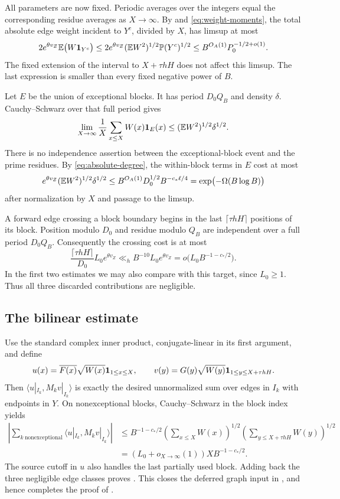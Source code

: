 All parameters are now fixed. Periodic averages over the integers equal
the corresponding residue averages as $X\to\infty$. By
 and \eqref{eq:weight-moments}, the total absolute
edge weight incident to $Y^c$, divided by $X$, has limsup at most
\[
 2e^{\theta v_Z}\mathbb E\bigl(W\mathbf 1_{Y^c}\bigr)
 \le 2e^{\theta v_Z}(\mathbb E W^2)^{1/2}\mathbb P(Y^c)^{1/2}
 \le B^{O_A(1)}P_0^{-1/2+o(1)}.
\]
The fixed extension of the interval to $X+\tau hH$ does not affect this
limsup. The last expression is smaller than every fixed negative power
of $B$.

Let $E$ be the union of exceptional blocks. It has period $D_0Q_B$ and
density $\delta$. Cauchy--Schwarz over that full period gives
\[
 \lim_{X\to\infty}\frac1X\sum_{x\le X}W(x)\mathbf 1_E(x)
 \le (\mathbb E W^2)^{1/2}\delta^{1/2}.
\]
There is no independence assertion between the exceptional-block event
and the prime residues. By \eqref{eq:absolute-degree}, the within-block
terms in $E$ cost at most
\[
 e^{\theta v_Z}(\mathbb E W^2)^{1/2}\delta^{1/2}
 \le B^{O_A(1)}D_0^{1/2}B^{-c_*\ell/4}
 =\exp\bigl(-\Omega(B\log B)\bigr)
\]
after normalization by $X$ and passage to the limsup.

A forward edge crossing a block boundary begins in the last
$\lceil\tau hH\rceil$ positions of its block. Position modulo $D_0$
and residue modulo $Q_B$ are independent over a full period $D_0Q_B$.
Consequently the crossing cost is at most
\[
 \frac{\lceil\tau hH\rceil}{D_0}L_0e^{\theta v_Z}
 \ll_h B^{-10}L_0e^{\theta v_Z}
 =o\bigl(L_0B^{-1-c_*/2}\bigr).
\]
In the first two estimates we may also compare with this target, since
$L_0\ge1$. Thus all three discarded contributions are negligible.

\subsection{The bilinear estimate}

Use the standard complex inner product, conjugate-linear in its first
argument, and define
\[
 u(x)=\overline{F(x)}\sqrt{W(x)}\mathbf 1_{1\le x\le X},\qquad
 v(y)=G(y)\sqrt{W(y)}\mathbf 1_{1\le y\le X+\tau hH}.
\]
Then $\langle u|_{I_k},M_kv|_{I_k}\rangle$ is exactly the desired
unnormalized sum over edges in $I_k$ with endpoints in $Y$.
On nonexceptional blocks, Cauchy--Schwarz in the block index yields
\begin{align*}
 \left|\sum_{k\ \mathrm{nonexceptional}}
      \langle u|_{I_k},M_kv|_{I_k}\rangle\right|
 &\le B^{-1-c_*/2}
       \left(\sum_{x\le X}W(x)\right)^{1/2}
       \left(\sum_{y\le X+\tau hH}W(y)\right)^{1/2}\\
 &=(L_0+o_{X\to\infty}(1))X B^{-1-c_*/2}.
\end{align*}
The source cutoff in $u$ also handles the last partially used block.
Adding back the three negligible edge classes proves
. This closes the deferred graph input in
, and hence completes the proof of
.

